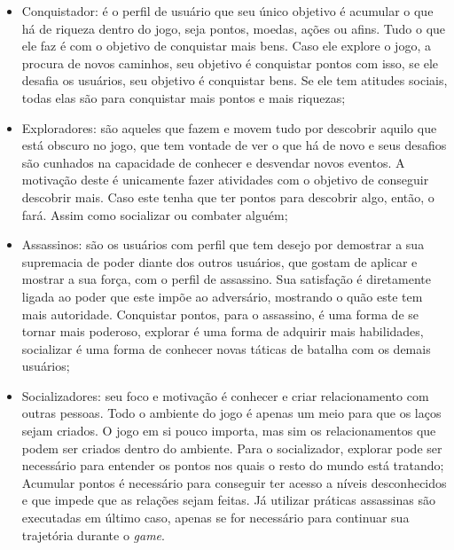 \begin{itemize}
    \item Conquistador: é o perfil de usuário que seu único objetivo é acumular o
        que há de riqueza dentro do jogo, seja pontos, moedas, ações ou afins.
        Tudo o que ele faz é com o objetivo de conquistar mais bens. Caso ele explore
        o jogo, a procura de novos caminhos, seu objetivo é conquistar pontos com
        isso, se ele desafia os usuários, seu objetivo é conquistar bens. Se ele
        tem atitudes sociais, todas elas são para conquistar mais pontos e mais riquezas;
    \item Exploradores: são aqueles que fazem e movem tudo por descobrir aquilo
        que está obscuro no jogo, que tem vontade de ver o que há de novo e seus desafios
        são cunhados na capacidade de conhecer e desvendar novos eventos. A motivação
        deste é unicamente fazer atividades com o objetivo de conseguir descobrir mais.
        Caso este tenha que ter pontos para descobrir algo, então, o fará. Assim
        como socializar ou combater alguém;
    \item Assassinos: são os usuários com perfil que tem desejo por demostrar a sua
        supremacia de poder diante dos outros usuários, que gostam de aplicar
        e mostrar a sua força, com o perfil de assassino. Sua satisfação
        é diretamente ligada ao poder que este impõe ao adversário, mostrando
        o quão este tem mais autoridade. Conquistar pontos, para o assassino, é uma forma
        de se tornar mais poderoso, explorar é uma forma de adquirir mais habilidades,
        socializar é uma forma de conhecer novas táticas de batalha com os demais
        usuários;
    \item Socializadores: seu foco e motivação é conhecer e criar relacionamento
        com outras pessoas. Todo o ambiente do jogo é apenas um meio para que
        os laços sejam criados. O jogo em si pouco importa, mas sim os relacionamentos
        que podem ser criados dentro do ambiente. Para o socializador, explorar pode
        ser necessário para entender os pontos nos quais o resto do mundo está tratando;
        Acumular pontos é necessário para conseguir ter acesso a níveis desconhecidos
        e que impede que as relações sejam feitas. Já utilizar práticas assassinas são
        executadas em último caso, apenas se for necessário para continuar sua trajetória
        durante o \textit{game}.
\end{itemize}

